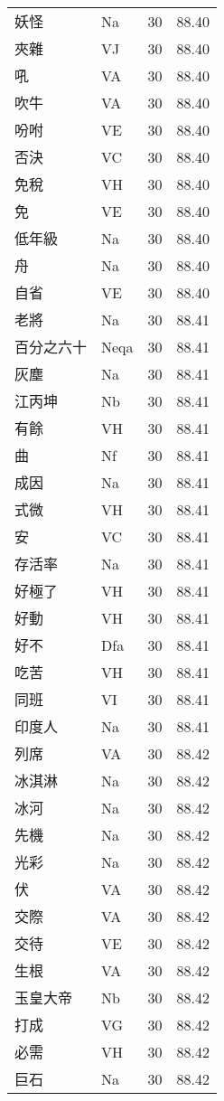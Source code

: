 \documentclass[twocolumn]{book}
\begin{document}
\begin{supertabular}{llrr}
妖怪 & Na & 30 &  88.40\\
夾雜 & VJ & 30 &  88.40\\
吼 & VA & 30 &  88.40\\
吹牛 & VA & 30 &  88.40\\
吩咐 & VE & 30 &  88.40\\
否決 & VC & 30 &  88.40\\
免稅 & VH & 30 &  88.40\\
免 & VE & 30 &  88.40\\
低年級 & Na & 30 &  88.40\\
舟 & Na & 30 &  88.40\\
自省 & VE & 30 &  88.40\\
老將 & Na & 30 &  88.41\\
百分之六十 & Neqa & 30 &  88.41\\
灰塵 & Na & 30 &  88.41\\
江丙坤 & Nb & 30 &  88.41\\
有餘 & VH & 30 &  88.41\\
曲 & Nf & 30 &  88.41\\
成因 & Na & 30 &  88.41\\
式微 & VH & 30 &  88.41\\
安 & VC & 30 &  88.41\\
存活率 & Na & 30 &  88.41\\
好極了 & VH & 30 &  88.41\\
好動 & VH & 30 &  88.41\\
好不 & Dfa & 30 &  88.41\\
吃苦 & VH & 30 &  88.41\\
同班 & VI & 30 &  88.41\\
印度人 & Na & 30 &  88.41\\
列席 & VA & 30 &  88.42\\
冰淇淋 & Na & 30 &  88.42\\
冰河 & Na & 30 &  88.42\\
先機 & Na & 30 &  88.42\\
光彩 & Na & 30 &  88.42\\
伏 & VA & 30 &  88.42\\
交際 & VA & 30 &  88.42\\
交待 & VE & 30 &  88.42\\
生根 & VA & 30 &  88.42\\
玉皇大帝 & Nb & 30 &  88.42\\
打成 & VG & 30 &  88.42\\
必需 & VH & 30 &  88.42\\
巨石 & Na & 30 &  88.42\\

\end{supertabular}
\end{document}
